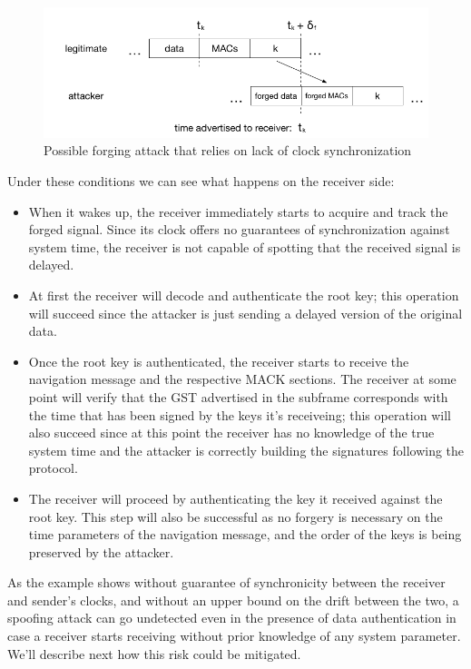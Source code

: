 \begin{figure}[h!]
  \includegraphics[width=\linewidth]{figures/delay_attack.png}
  \caption{Possible forging attack that relies on lack of clock synchronization}
  \label{fig:delay_attack}
\end{figure}

Under these conditions we can see what happens on the receiver side:
\begin{itemize}
  \item When it wakes up, the receiver immediately starts to acquire and track
    the forged signal. Since its clock offers no guarantees of synchronization
    against system time, the receiver is not capable of spotting that the
    received signal is delayed.
  \item At first the receiver will decode and authenticate the root key; this
    operation will succeed since the attacker is just sending a delayed version
    of the original data.
  \item Once the root key is authenticated, the receiver starts to receive the
    navigation message and the respective MACK sections. The receiver at some
    point will verify that the GST advertised in the subframe corresponds with
    the time that has been signed by the keys it's receiveing; this operation
    will also succeed since at this point the receiver has no knowledge of the
    true system time and the attacker is correctly building the signatures
    following the protocol.
  \item The receiver will proceed by authenticating the key it received against
    the root key. This step will also be successful as no forgery is necessary
    on the time parameters of the navigation message, and the order of the keys
    is being preserved by the attacker.
\end{itemize}

As the example shows without guarantee of synchronicity between the receiver
and sender's clocks, and without an upper bound on the drift between the two, a
spoofing attack can go undetected even in the presence of data authentication in
case a receiver starts receiving without prior knowledge of any system
parameter. We'll describe next how this risk could be mitigated.

